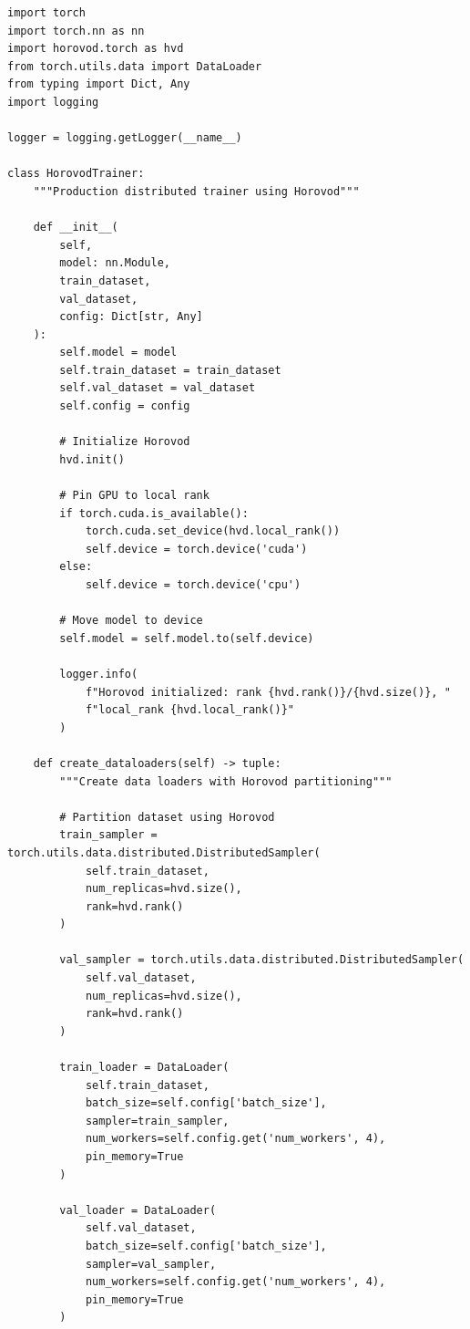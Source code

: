 \begin{lstlisting}[style=python, caption=Distributed Training with Horovod]
import torch
import torch.nn as nn
import horovod.torch as hvd
from torch.utils.data import DataLoader
from typing import Dict, Any
import logging

logger = logging.getLogger(__name__)

class HorovodTrainer:
    """Production distributed trainer using Horovod"""

    def __init__(
        self,
        model: nn.Module,
        train_dataset,
        val_dataset,
        config: Dict[str, Any]
    ):
        self.model = model
        self.train_dataset = train_dataset
        self.val_dataset = val_dataset
        self.config = config

        # Initialize Horovod
        hvd.init()

        # Pin GPU to local rank
        if torch.cuda.is_available():
            torch.cuda.set_device(hvd.local_rank())
            self.device = torch.device('cuda')
        else:
            self.device = torch.device('cpu')

        # Move model to device
        self.model = self.model.to(self.device)

        logger.info(
            f"Horovod initialized: rank {hvd.rank()}/{hvd.size()}, "
            f"local_rank {hvd.local_rank()}"
        )

    def create_dataloaders(self) -> tuple:
        """Create data loaders with Horovod partitioning"""

        # Partition dataset using Horovod
        train_sampler = torch.utils.data.distributed.DistributedSampler(
            self.train_dataset,
            num_replicas=hvd.size(),
            rank=hvd.rank()
        )

        val_sampler = torch.utils.data.distributed.DistributedSampler(
            self.val_dataset,
            num_replicas=hvd.size(),
            rank=hvd.rank()
        )

        train_loader = DataLoader(
            self.train_dataset,
            batch_size=self.config['batch_size'],
            sampler=train_sampler,
            num_workers=self.config.get('num_workers', 4),
            pin_memory=True
        )

        val_loader = DataLoader(
            self.val_dataset,
            batch_size=self.config['batch_size'],
            sampler=val_sampler,
            num_workers=self.config.get('num_workers', 4),
            pin_memory=True
        )


\end{lstlisting}
